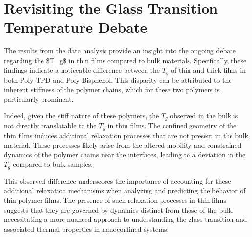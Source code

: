 \section{Revisiting the Glass Transition Temperature Debate}

The results from the data analysis provide an insight into the ongoing debate regarding the \ac{$T_g$} in thin films compared to bulk materials. Specifically, these findings indicate a noticeable difference between the \(T_g\) of thin and thick films in both Poly-TPD and Poly-Bisphenol. This disparity can be attributed to the inherent stiffness of the polymer chains, which for these two polymers is particularly prominent.

Indeed, given the stiff nature of these polymers, the \(T_g\) observed in the bulk is not directly translatable to the \(T_g\) in thin films. The confined geometry of the thin films induces additional relaxation processes that are not present in the bulk material. These processes likely arise from the altered mobility and constrained dynamics of the polymer chains near the interfaces, leading to a deviation in the \(T_g\) compared to bulk samples.

This observed difference underscores the importance of accounting for these additional relaxation mechanisms when analyzing and predicting the behavior of thin polymer films. The presence of such relaxation processes in thin films suggests that they are governed by dynamics distinct from those of the bulk, necessitating a more nuanced approach to understanding the glass transition and associated thermal properties in nanoconfined systems.
